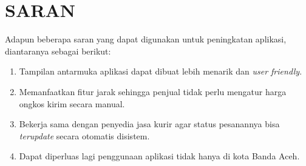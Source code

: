 \section{\uppercase{SARAN}}
Adapun beberapa saran yang dapat digunakan untuk peningkatan aplikasi, diantaranya sebagai berikut:
\begin{enumerate}
    \item Tampilan antarmuka aplikasi dapat dibuat lebih menarik dan \textit{user friendly}.
    \item Memanfaatkan fitur jarak sehingga penjual tidak perlu mengatur harga ongkos kirim secara manual.
    \item Bekerja sama dengan penyedia jasa kurir agar status pesanannya bisa \textit{terupdate} secara otomatis disistem.
    \item Dapat diperluas lagi penggunaan aplikasi tidak hanya di kota Banda Aceh.
\end{enumerate}


\begin{comment}

\end{comment}